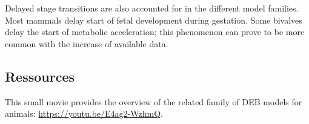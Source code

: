 Delayed stage transitions are also accounted for in the different model families. 
Most mammals delay start of fetal development during gestation. 
Some bivalves delay the start of metabolic acceleration; 
this phenomenon can prove to be more common with the increase of available data.

\subsection{Ressources}

This small movie provides the overview of the related family of DEB models for animals: \url{https://youtu.be/E4ag2-WzhmQ}.